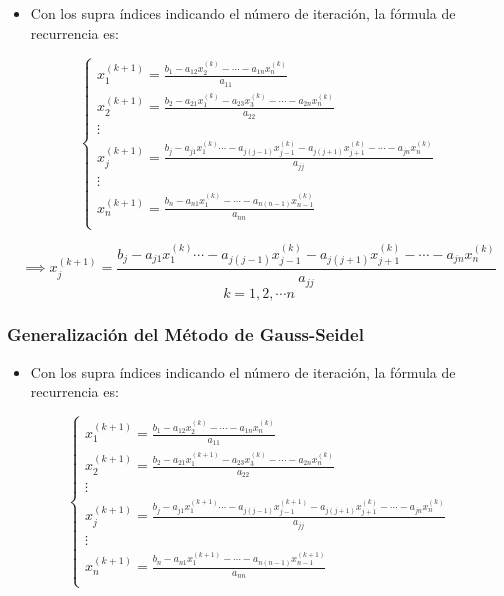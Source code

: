 \documentclass[openany]{book}
\providecommand{\tightlist}{%
  \setlength{\itemsep}{0pt}\setlength{\parskip}{0pt}}
\begin{document}
\begin{itemize}
\tightlist
\item
  Con los supra índices indicando el número de iteración, la fórmula de recurrencia es:
\end{itemize}

\[
\begin{cases} 
x_1^{(k+1)} = \frac{b_1 - a_{12}x_2^{(k)} - \cdots - a_{1n}x_n^{(k)}}{ a_{11}}\\
x_2^{(k+1)} = \frac{b_2 - a_{21}x_1^{(k)} - a_{23}x_3^{(k)} - \cdots - a_{2n}x_n^{(k)}}{ a_{22}}\\
\vdots \\
x_j^{(k+1)} = \frac{b_j - a_{j1}x_1^{(k)} \cdots - a_{j(j-1)}x_{j-1}^{(k)} - a_{j(j+1)}x_{j+1}^{(k)} - \cdots - a_{jn}x_n^{(k)}}{ a_{jj}}\\
\vdots \\
x_n^{(k+1)} = \frac{b_n - a_{n1}x_1^{(k)} - \cdots - a_{n(n-1)}x_{n-1}^{(k)}}{a_{nn}}\\
\end{cases}
\]

\[
\implies
x_j^{(k+1)} = \frac{b_j - a_{j1}x_1^{(k)} \cdots - a_{j(j-1)}x_{j-1}^{(k)} - a_{j(j+1)}x_{j+1}^{(k)} - \cdots - a_{jn}x_n^{(k)}}{ a_{jj}}
\]
\[
k=1, 2, \cdots n
\]

\hypertarget{generalizaciuxf3n-del-muxe9todo-de-gauss-seidel}{%
\subsubsection{Generalización del Método de Gauss-Seidel}\label{generalizaciuxf3n-del-muxe9todo-de-gauss-seidel}}

\begin{itemize}
\tightlist
\item
  Con los supra índices indicando el número de iteración, la fórmula de recurrencia es:
\end{itemize}

\[
\begin{cases} 
x_1^{(k+1)} = \frac{b_1 - a_{12}x_2^{(k)} - \cdots - a_{1n}x_n^{(k)}}{ a_{11}}\\
x_2^{(k+1)} = \frac{b_2 - a_{21}x_1^{(k+1)} - a_{23}x_3^{(k)} - \cdots - a_{2n}x_n^{(k)}}{ a_{22}}\\
\vdots \\
x_j^{(k+1)} = \frac{b_j - a_{j1}x_1^{(k+1)} \cdots - a_{j(j-1)}x_{j-1}^{(k+1)} - a_{j(j+1)}x_{j+1}^{(k)} - \cdots - a_{jn}x_n^{(k)}}{ a_{jj}}\\
\vdots \\
x_n^{(k+1)} = \frac{b_n - a_{n1}x_1^{(k+1)} - \cdots - a_{n(n-1)}x_{n-1}^{(k+1)}}{a_{nn}}\\
\end{cases}
\]
\end{document}
